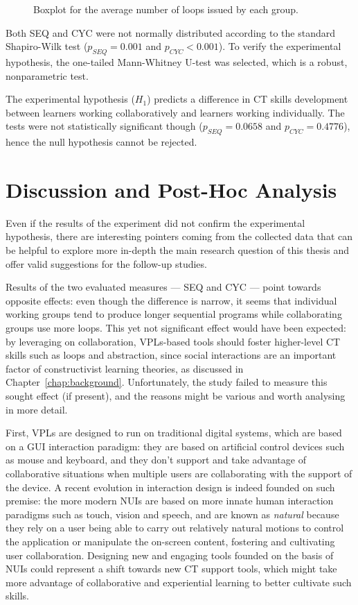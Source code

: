 \begin{figure}[ht!]
  \centering
  
  \caption{Boxplot for the average number of loops issued by each group.}\label{fig:avgl}
\end{figure}

Both SEQ and CYC were not normally distributed according to the standard Shapiro-Wilk test (\(p_{SEQ} = 0.001\) and \(p_{CYC} < 0.001\)). To verify the experimental hypothesis, the one-tailed Mann-Whitney U-test was selected, which is a robust, nonparametric test.

The experimental hypothesis (\(H_1\)) predicts a difference in \ac{CT} skills development between learners working collaboratively and learners working individually. The tests were not statistically significant though (\(p_{SEQ} = 0.0658\) and \(p_{CYC} = 0.4776\)), hence the null hypothesis cannot be rejected.

\section{Discussion and Post-Hoc Analysis}
Even if the results of the experiment did not confirm the experimental hypothesis, there are interesting pointers coming from the collected data that can be helpful to explore more in-depth the main research question of this thesis and offer valid suggestions for the follow-up studies.

Results of the two evaluated measures --- SEQ and CYC --- point towards opposite effects: even though the difference is narrow, it seems that individual working groups tend to produce longer sequential programs while collaborating groups use more loops. This yet not significant effect would have been expected: by leveraging on collaboration, \acp{VPL}-based tools should foster higher-level \ac{CT} skills such as loops and abstraction, since social interactions are an important factor of constructivist learning theories, as discussed in Chapter~\ref{chap:background}. Unfortunately, the study failed to measure this sought effect (if present), and the reasons might be various and worth analysing in more detail.

First, \acp{VPL} are designed to run on traditional digital systems, which are based on a \ac{GUI} interaction paradigm: they are based on artificial control devices such as mouse and keyboard, and they don't support and take advantage of collaborative situations when multiple users are collaborating with the support of the device. A recent evolution in interaction design is indeed founded on such premise: the more modern \acp{NUI} are based on more innate human interaction paradigms such as touch, vision and speech, and are known as \emph{natural} because they rely on a user being able to carry out relatively natural motions to control the application or manipulate the on-screen content, fostering and cultivating user collaboration. Designing new and engaging tools founded on the basis of \acp{NUI} could represent a shift towards new \ac{CT} support tools, which might take more advantage of collaborative and experiential learning to better cultivate such skills.


